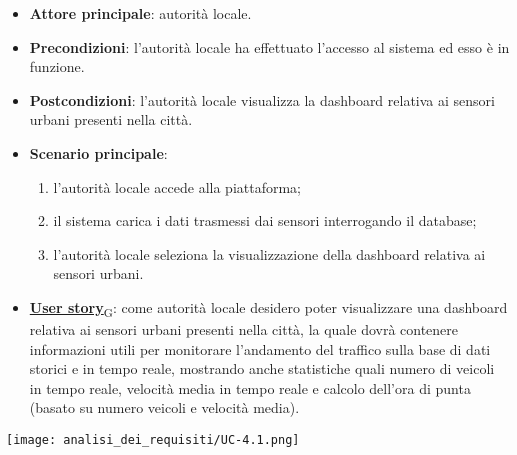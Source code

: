 \begin{itemize}
	\item \textbf{Attore principale}: autorità locale.
	\item \textbf{Precondizioni}: l'autorità locale ha effettuato l'accesso al sistema ed esso è in funzione.
	\item \textbf{Postcondizioni}: l'autorità locale visualizza la dashboard relativa
	      ai sensori urbani presenti nella città.
	\item \textbf{Scenario principale}:
	      \begin{enumerate}
		      \item l'autorità locale accede alla piattaforma;
		      \item il sistema carica i dati trasmessi dai sensori interrogando il database;
		      \item l'autorità locale seleziona la visualizzazione della dashboard relativa ai sensori urbani.
	      \end{enumerate}
	\item \href{https://7last.github.io/docs/pb/documentazione-interna/glossario\#user-story}{\textbf{User story}\textsubscript{G}}:
	      come autorità locale desidero poter visualizzare una dashboard relativa ai sensori urbani presenti nella città, la quale
	      dovrà contenere informazioni utili per monitorare l'andamento del traffico sulla base di dati storici e in tempo reale, mostrando
	      anche statistiche quali numero di veicoli in tempo reale, velocità media in tempo reale e calcolo dell'ora di punta (basato su numero veicoli e velocità media).
\end{itemize}
\begin{center}
	\texttt{[image: analisi\_dei\_requisiti/UC-4.1.png]}
\end{center}


